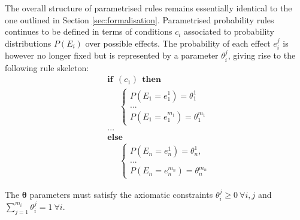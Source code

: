 The overall structure of parametrised rules remains essentially identical to the one outlined in Section \ref{sec:formalisation}.  Parametrised probability rules continues to be defined in terms of conditions $c_i$ associated to probability distributions $P(E_i)$ over possible effects.  The probability of each effect $e_i^j$ is however no longer fixed but is represented by a parameter $\theta_i^j$, giving rise to the following rule skeleton: 
\begin{equation}
\begin{aligned}
& \textbf{if} \ \ (c_{1}) \ \ \textbf{then} \\ 
& \;\;\;\;\; \begin{cases}
P(E_1\!=\!e_1^1) = \theta_1^1 \\
 ... \\
P(E_1\!=\!e_1^{m_1}) = \theta_1^{m_1} 
\end{cases} \\[3mm]
& ...  \\
& \textbf{else} \\
& \;\;\;\;\; \begin{cases}
P(E_{n}\!=\!e_{n}^1) = \theta_{n}^1, \\
... \\
P(E_{n}\!=\!e_{n}^{m_{n}}) = \theta_{n}^{m_{n}}
\end{cases}
\end{aligned}
\label{eq:probrule}
\end{equation}

The $\boldsymbol\theta$ parameters must satisfy the axiomatic constraints $\theta_i^j \geq 0  \ \forall i,j$ and $\sum_{j = 1}^{m_i} \theta_i^j = 1 \ \forall i$.

